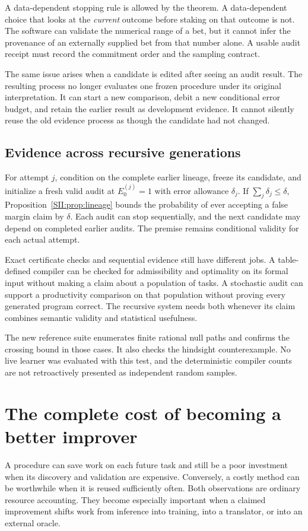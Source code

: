 A data-dependent stopping rule is allowed by the theorem. A data-dependent choice that looks at the \emph{current} outcome before staking on that outcome is not. The software can validate the numerical range of a bet, but it cannot infer the provenance of an externally supplied bet from that number alone. A usable audit receipt must record the commitment order and the sampling contract.

The same issue arises when a candidate is edited after seeing an audit result. The resulting process no longer evaluates one frozen procedure under its original interpretation. It can start a new comparison, debit a new conditional error budget, and retain the earlier result as development evidence. It cannot silently reuse the old evidence process as though the candidate had not changed.

\subsection{Evidence across recursive generations}
For attempt $j$, condition on the complete earlier lineage, freeze its candidate, and initialize a fresh valid audit at $E_0^{(j)}=1$ with error allowance $\delta_j$. If $\sum_j\delta_j\leq\delta$, Proposition~\ref{SII:prop:lineage} bounds the probability of ever accepting a false margin claim by $\delta$. Each audit can stop sequentially, and the next candidate may depend on completed earlier audits. The premise remains conditional validity for each actual attempt.

Exact certificate checks and sequential evidence still have different jobs. A table-defined compiler can be checked for admissibility and optimality on its formal input without making a claim about a population of tasks. A stochastic audit can support a productivity comparison on that population without proving every generated program correct. The recursive system needs both whenever its claim combines semantic validity and statistical usefulness.

The new reference suite enumerates finite rational null paths and confirms the crossing bound in those cases. It also checks the hindsight counterexample. No live learner was evaluated with this test, and the deterministic compiler counts are not retroactively presented as independent random samples.

\section{The complete cost of becoming a better improver}\label{SII:sec:cost}
A procedure can save work on each future task and still be a poor investment when its discovery and validation are expensive. Conversely, a costly method can be worthwhile when it is reused sufficiently often. Both observations are ordinary resource accounting. They become especially important when a claimed improvement shifts work from inference into training, into a translator, or into an external oracle.

